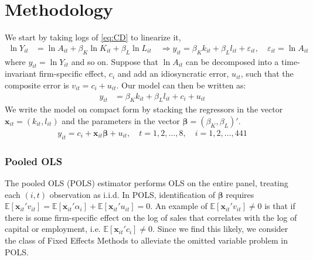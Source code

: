 \section{Methodology} \label{sec:methodology}

We start by taking logs of \eqref{eq:CD} to linearize it,
\begin{align*}
    \ln Y_{it} &= \ln A_{it} + \beta_K \ln K_{it} + \beta_L \ln L_{it} \quad \Longrightarrow
    y_{it} = \beta_K k_{it} + \beta_L l_{it} + \varepsilon_{it}, \quad \varepsilon_{it} = \ln A_{it}
\end{align*}
where $y_{it} = \ln Y_{it}$ and so on. Suppose that $\ln A_{it}$ can be decomposed into a time-invariant firm-specific effect, $c_i$ and add an idiosyncratic error, $u_{it}$, such that the composite error is $v_{it} = c_i + u_{it}$. Our model can then be written as:
\begin{align*}
    y_{it} &= \beta_K k_{it} + \beta_L l_{it}+c_i + u_{it}
\end{align*}
We write the model on compact form by stacking the regressors in the vector $\bm{x}_{it} = (k_{it}, l_{it})$ and the parameters in the vector $\bm{\beta} = (\beta_K, \beta_L)'$.
\begin{align} \label{equationline}
    y_{it} = c_i + \bm{x}_{it} \bm{\beta} + u_{it}, \quad t=1,2,\ldots,8, \quad i=1,2,\ldots,441
\end{align}



\subsubsection*{Pooled OLS}
The pooled OLS (POLS) estimator performs OLS on the entire panel, treating each $(i,t)$ observation as i.i.d. In POLS, identification of $\pmb{\beta}$ requires  $\mathbb{E}[\pmb{x}_{it}'v_{it}]=\mathbb{E}[\pmb{x}_{it}'\alpha_{i}]+\mathbb{E}[\pmb{x}_{it}'u_{it}]=0$.
An example of $\mathbb{E}[\pmb{x}_{it}'v_{it}]\neq0$ is that if there is some firm-specific effect on the log of sales that correlates with the log of capital or employment, i.e. $\mathbb{E}[\pmb{x}_{it}'c_{i}]\neq0$. Since we find this likely, we consider the class of Fixed Effects Methods to alleviate the omitted variable problem in POLS.

